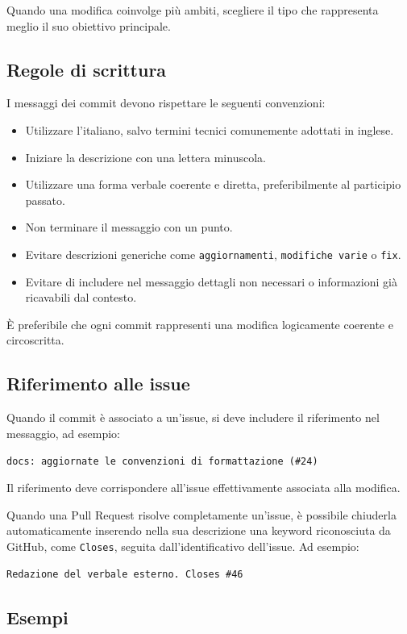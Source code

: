 \documentclass[11pt, a4paper]{article}
\begin{document}
\noindent Quando una modifica coinvolge più ambiti, scegliere il tipo che rappresenta meglio il suo obiettivo principale.

\subsection{Regole di scrittura}

I messaggi dei commit devono rispettare le seguenti convenzioni:
\begin{itemize}
    \item Utilizzare l'italiano, salvo termini tecnici comunemente adottati in inglese.
    \item Iniziare la descrizione con una lettera minuscola.
    \item Utilizzare una forma verbale coerente e diretta, preferibilmente al participio passato.
    \item Non terminare il messaggio con un punto.
    \item Evitare descrizioni generiche come \texttt{aggiornamenti}, \texttt{modifiche varie} o \texttt{fix}.
    \item Evitare di includere nel messaggio dettagli non necessari o informazioni già ricavabili dal contesto.
\end{itemize}

\noindent È preferibile che ogni commit rappresenti una modifica logicamente coerente e circoscritta.

\subsection{Riferimento alle issue}

Quando il commit è associato a un'issue, si deve includere il riferimento nel messaggio, ad esempio:

\noindent \texttt{docs: aggiornate le convenzioni di formattazione (\#24)}

\noindent Il riferimento deve corrispondere all'issue effettivamente associata alla modifica.

Quando una Pull Request risolve completamente un'issue, è possibile chiuderla automaticamente inserendo nella sua descrizione una keyword riconosciuta da GitHub, come \texttt{Closes}, seguita dall'identificativo dell'issue. Ad esempio:

\noindent \texttt{Redazione del verbale esterno. Closes \#46}

\subsection{Esempi}
\end{document}
